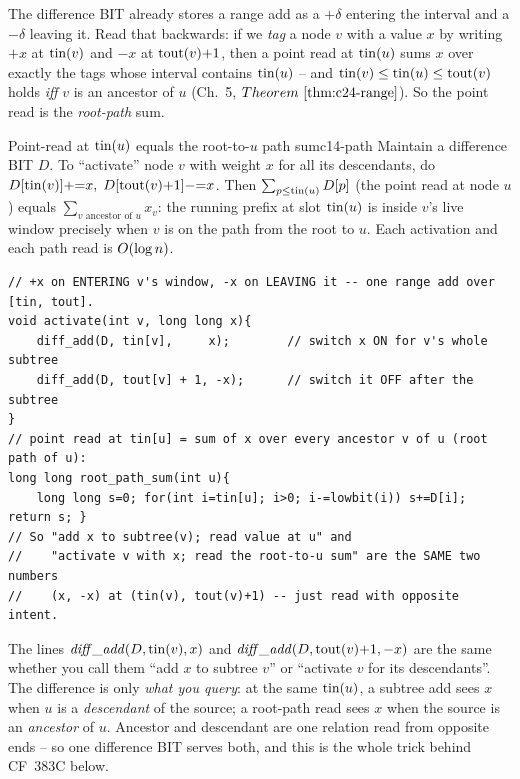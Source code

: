 The difference BIT already stores a range add as a \(+\delta\) entering the
interval and a \(-\delta\) leaving it.  Read that backwards: if we \emph{tag}
a node \(v\) with a value \(x\) by writing \(+x\) at \(\operatorname{tin}(v)\) and \(-x\) at
\(\operatorname{tout}(v){+}1\), then a point read at \(\operatorname{tin}(u)\) sums \(x\) over exactly the
tags whose interval contains \(\operatorname{tin}(u)\) -- and \(\operatorname{tin}(v)\le\operatorname{tin}(u)\le\operatorname{tout}(v)\)
holds \emph{iff} \(v\) is an ancestor of \(u\) (Ch.~5, \(\thmref{c24-range}\)).
So the point read is the \emph{root-path} sum.

\begin{proposition}{Point-read at \(\operatorname{tin}(u)\) equals the root-to-\(u\) path sum}{c14-path}
Maintain a difference BIT \(D\).  To ``activate'' node \(v\) with weight \(x\)
for all its descendants, do \(D[\operatorname{tin}(v)]{+}{=}x,\;D[\operatorname{tout}(v){+}1]{-}{=}x\).
Then \(\sum_{p\le\operatorname{tin}(u)} D[p]\) (the point read at node \(u\)) equals
\(\sum_{v \text{ ancestor of } u} x_v\): the running prefix at slot
\(\operatorname{tin}(u)\) is inside \(v\)'s live window precisely when \(v\) is on the path
from the root to \(u\).  Each activation and each path read is \(O(\log n)\).
\end{proposition}

\begin{lstlisting}[caption={two-event activation: subtree-add semantics become root-path reads}, label={lst:c14-path}]
// +x on ENTERING v's window, -x on LEAVING it -- one range add over [tin, tout].
void activate(int v, long long x){
    diff_add(D, tin[v],     x);        // switch x ON for v's whole subtree
    diff_add(D, tout[v] + 1, -x);      // switch it OFF after the subtree
}
// point read at tin[u] = sum of x over every ancestor v of u (root path of u):
long long root_path_sum(int u){
    long long s=0; for(int i=tin[u]; i>0; i-=lowbit(i)) s+=D[i]; return s; }
// So "add x to subtree(v); read value at u" and
//    "activate v with x; read the root-to-u sum" are the SAME two numbers
//    (x, -x) at (tin(v), tout(v)+1) -- just read with opposite intent.
\end{lstlisting}

\begin{insightbox}
The lines \(\mathit{diff\_add}(D,\operatorname{tin}(v),x)\) and
\(\mathit{diff\_add}(D,\operatorname{tout}(v){+}1,-x)\) are the same whether you call them
``add \(x\) to subtree \(v\)'' or ``activate \(v\) for its descendants''.  The
difference is only \emph{what you query}: at the same \(\operatorname{tin}(u)\), a subtree
add sees \(x\) when \(u\) is a \emph{descendant} of the source; a root-path
read sees \(x\) when the source is an \emph{ancestor} of \(u\).  Ancestor and
descendant are one relation read from opposite ends -- so one difference BIT
serves both, and this is the whole trick behind CF~383C below.
\end{insightbox}

